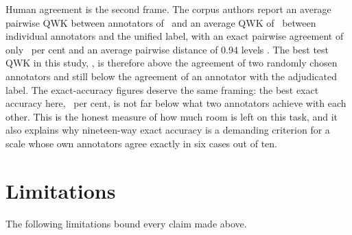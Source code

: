 Human agreement is the second frame. The corpus authors report an average pairwise QWK between
annotators of \iaaPairwiseQwk\ and an average QWK of \iaaUnifiedQwk\ between individual
annotators and the unified label, with an exact pairwise agreement of only
\iaaPairwiseAcc\ per cent and an average pairwise distance of 0.94 levels
\cite{elmadani2025barec}. The best test QWK in this study, \testQwkCoralHeadlr, is therefore
above the agreement of two randomly chosen annotators and still below the agreement of an
annotator with the adjudicated label. The exact-accuracy figures deserve the same framing: the
best exact accuracy here, \testAccSoftFive\ per cent, is not far below what two annotators
achieve with each other. This is the honest measure of how much room is left on this task, and
it also explains why nineteen-way exact accuracy is a demanding criterion for a scale whose own
annotators agree exactly in six cases out of ten.

\section{Limitations}
\label{sec:res-limits}

The following limitations bound every claim made above.

